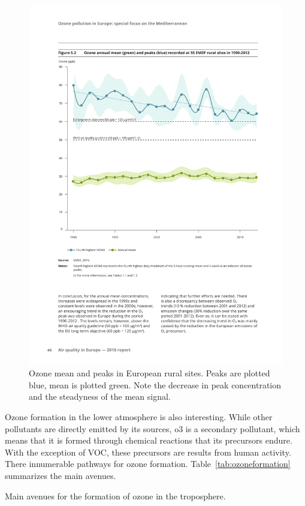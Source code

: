 \begin{figure}[htpb]
    \centering
    \includegraphics[clip,%
    trim=2.2cm 10.2cm 2cm 4.4cm,%
    width=.8\textwidth]{img/pdf/eea2018_ozone_peaks.pdf}
    \caption{Ozone mean and peaks in European rural sites. Peaks are
    plotted blue, mean is plotted green. Note the decrease in peak
    concentration and the steadyness of the mean signal.}
    \label{fig:o3peaksvsmean}
\end{figure}

Ozone formation in the lower atmosphere is also interesting. While other
pollutants are directly emitted by its sources, \gls{o3} is a secondary
pollutant, which means that it is formed through chemical reactions that
its precursors endure. With the exception of \gls{VOC}, these precursors
are results from human activity. There innumerable pathways for ozone
formation. Table~\ref{tab:ozoneformation} summarizes the main avenues.

\begin{table}
    \centering
    \caption{Main avenues for the formation of ozone in the troposphere.}
    \label{tab:ozoneformation}
\end{table}



